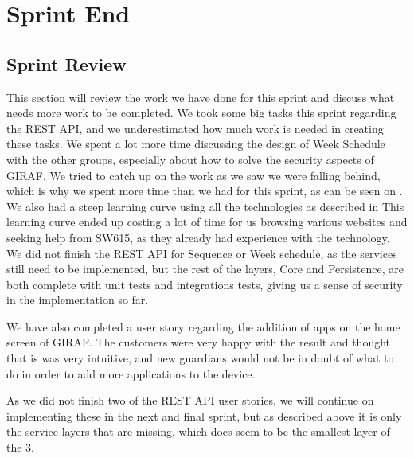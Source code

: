 \chapter{Sprint End}

\section{Sprint Review}\label{sprintreview3}
This section will review the work we have done for this sprint and discuss what needs more work to be completed.
We took some big tasks this sprint regarding the REST API, and we underestimated how much work is needed in creating these tasks.
We spent a lot more time discussing the design of Week Schedule with the other groups, especially about how to solve the security aspects of GIRAF.
We tried to catch up on the work as we saw we were falling behind, which is why we spent more time than we had for this sprint, as can be seen on .
We also had a steep learning curve using all the technologies as described in 
This learning curve ended up costing a lot of time for us browsing various websites and seeking help from SW615, as they already had experience with the technology.
We did not finish the REST API for Sequence or Week schedule, as the services still need to be implemented, but the rest of the layers, Core and Persistence, are both complete with unit tests and integrations tests, giving us a sense of security in the implementation so far.

We have also completed a user story regarding the addition of apps on the home screen of GIRAF.
The customers were very happy with the result and thought that is was very intuitive, and new guardians would not be in doubt of what to do in order to add more applications to the device.

As we did not finish two of the REST API user stories, we will continue on implementing these in the next and final sprint, but as described above it is only the service layers that are missing, which does seem to be the smallest layer of the 3.

